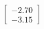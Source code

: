 \documentclass[preview]{standalone}
\begin{document}
\begin{align*}
\begin{bmatrix} -2.70 \\ -3.15 \end{bmatrix}
\end{align*}
\end{document}
